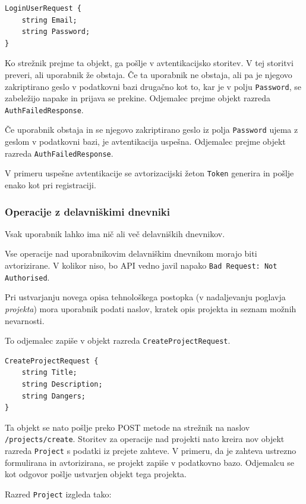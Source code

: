 \documentclass[a4paper, 12pt]{book}
\begin{document}
\begin{verbatim}
LoginUserRequest {
    string Email; 
    string Password; 
} 
\end{verbatim}

Ko strežnik prejme ta objekt, ga pošlje v avtentikacijsko storitev.
V tej storitvi preveri, ali uporabnik že obstaja.
Če ta uporabnik ne obstaja, ali pa je njegovo zakriptirano geslo v podatkovni bazi drugačno kot to, kar je v polju \texttt{Password}, se zabeležijo napake in prijava se prekine.
Odjemalec prejme objekt razreda \texttt{AuthFailedResponse}.

Če uporabnik obstaja in se njegovo zakriptirano geslo iz polja \texttt{Password} ujema z geslom v podatkovni bazi, je avtentikacija uspešna.
Odjemalec prejme objekt razreda \texttt{AuthFailedResponse}.

V primeru uspešne avtentikacije se avtorizacijski žeton \texttt{Token} generira in pošlje enako kot pri registraciji.

\subsubsection{Operacije z delavniškimi dnevniki}

Vsak uporabnik lahko ima nič ali več delavniških dnevnikov.

Vse operacije nad uporabnikovim delavniškim dnevnikom morajo biti avtorizirane.
V kolikor niso, bo API vedno javil napako \texttt{Bad Request: Not Authorised}.

Pri ustvarjanju novega opisa tehnološkega postopka (v nadaljevanju poglavja \textit{projekta}) mora uporabnik podati naslov, kratek opis projekta in seznam možnih nevarnosti.

To odjemalec zapiše v objekt razreda \texttt{CreateProjectRequest}.

\begin{verbatim}
CreateProjectRequest { 
    string Title;  
    string Description; 
    string Dangers; 
} 
\end{verbatim}

\noindent Ta objekt se nato pošlje preko POST metode na strežnik na naslov \texttt{/projects/create}.
Storitev za operacije nad projekti nato kreira nov objekt razreda \texttt{Project} s podatki iz prejete zahteve.
V primeru, da je zahteva ustrezno formulirana in avtorizirana, se projekt zapiše v podatkovno bazo.
Odjemalcu se kot odgovor pošlje ustvarjen objekt tega projekta.

\noindent Razred \texttt{Project} izgleda tako:
\end{document}
